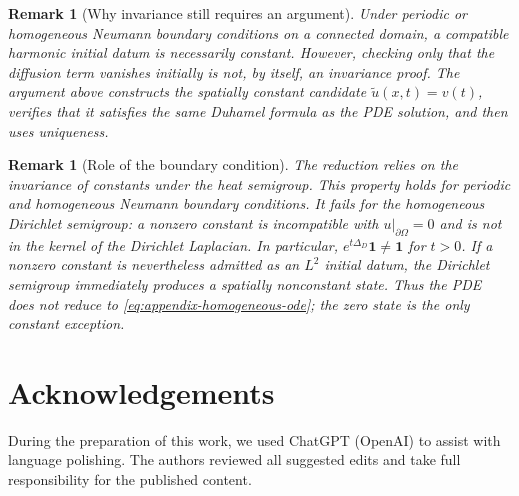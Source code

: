 \documentclass[final, 3p, times]{elsarticle}%
\newtheorem{remark}[theorem]{Remark}
\begin{document}
\begin{remark}[Why invariance still requires an argument]
Under periodic or homogeneous Neumann boundary conditions on a connected
domain, a compatible harmonic initial datum is necessarily constant. However,
checking only that the diffusion term vanishes initially is not, by itself, an
invariance proof. The argument above constructs the spatially constant
candidate $\widetilde u(x,t)=v(t)$, verifies that it satisfies the same Duhamel
formula as the PDE solution, and then uses uniqueness.
\end{remark}

\begin{remark}[Role of the boundary condition]
The reduction relies on the invariance of constants under the heat
semigroup. This property holds for periodic and homogeneous Neumann
boundary conditions. It fails for the homogeneous Dirichlet semigroup:
a nonzero constant is incompatible with $u|_{\partial\Omega}=0$ and is not
in the kernel of the Dirichlet Laplacian. In particular,
$e^{t\Delta_D}\mathbf 1\ne\mathbf 1$ for $t>0$. If a nonzero constant is
nevertheless admitted as an $L^2$ initial datum, the Dirichlet semigroup
immediately produces a spatially nonconstant state. Thus the PDE does not
reduce to \eqref{eq:appendix-homogeneous-ode}; the zero state is the only
constant exception.
\end{remark}

\section*{Acknowledgements}
During the preparation of this work, we used ChatGPT (OpenAI) to assist with language polishing. The authors reviewed all suggested edits and take full responsibility for the published content.

%


\end{document}
